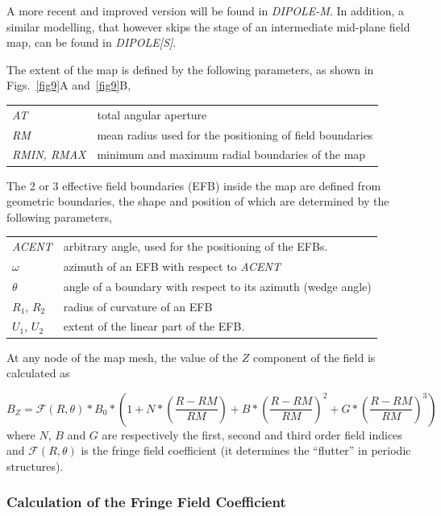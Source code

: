 {\medskip
\noindent A more recent and improved version will be 
found in \textsl{DIPOLE-M}. In addition, a similar modelling, that however skips 
the stage of an intermediate mid-plane field map, can be found in  \textsl{DIPOLE[S]}.

\medskip
\noindent The extent of the map is defined by the 
following parameters, as shown in Figs.~\ref{fig9}A and~\ref{fig9}B, 

 \begin{tabular}{>{\sl}l!{~:}l}
	 AT &  total angular aperture\\
	 RM & mean radius used for the positioning of field boundaries\\
	 RMIN, RMAX
	    &  minimum and maximum radial boundaries of the map 
 \end{tabular}
\bigskip

\noindent The 2 or 3 effective field boundaries (EFB) inside the map are
defined from  geometric boundaries, the shape and position of which are determined by the 
following parameters, 


\begin{tabular}{l!{~:}l}
	 \textsl{ACENT} 
	    & arbitrary  angle, used for the positioning of the EFBs. \\
	$\omega$ &  azimuth of an EFB with respect to  \textsl{ACENT}\\
	$\theta$ & angle of a boundary with respect to its azimuth (wedge angle)\\ 
	$R_1$, $R_2$  &  radius of curvature of an EFB\\
	$U_1$, $U_2$  &  extent of the linear part of the EFB. 
\end{tabular}
\bigskip

\noindent At  any node  of the map mesh, the value of the $Z$ 
component of the field is calculated as 

 \begin{equation}
	 B_Z =  \mathcal{F}(R,\theta) \ast  B_0 \ast  
	      \left(1+N \ast  
	           \left( \dfrac{R-RM }{ RM}\right) 
	           + B \ast  \left(\dfrac{R-RM }{ RM} \right)^2 
	           + G \ast  \left(\dfrac{R-RM }{ RM} \right)^3 
	      \right) 
 	\label{eq4-4-1}
 \end{equation}
%
 where  $ N$, $B $ and $ G $ are  respectively  the first, second and
third order field indices and $ \mathcal{F}(R,\theta)$ is the fringe field 
coefficient  (it determines the ``flutter''  in periodic structures).  


\subsubsection*{Calculation of the Fringe Field Coefficient} 

}
